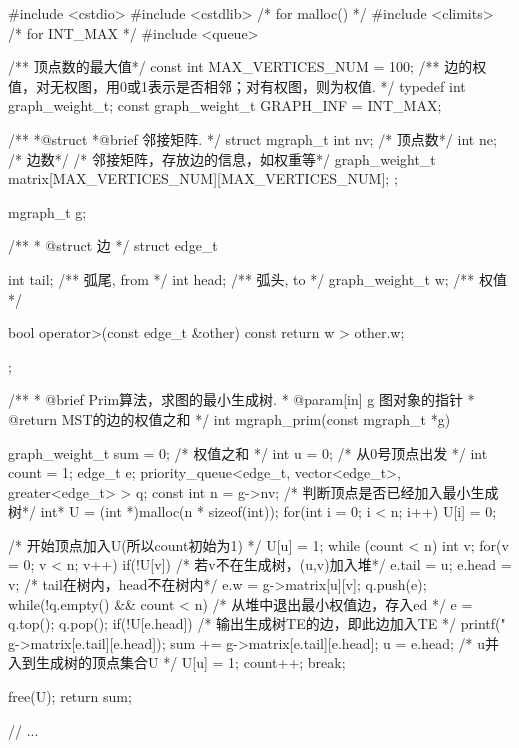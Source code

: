 \begin{Codex}[label=mgraph_prim2.cpp]
#include <cstdio>
#include <cstdlib>  /* for malloc() */
#include <climits>  /* for INT_MAX */
#include <queue>

/** 顶点数的最大值*/
const int MAX_VERTICES_NUM = 100;
/** 边的权值，对无权图，用0或1表示是否相邻；对有权图，则为权值. */
typedef int graph_weight_t;
const graph_weight_t GRAPH_INF = INT_MAX;

/**
 *@struct
 *@brief 邻接矩阵.
 */
struct mgraph_t {
    int nv; /* 顶点数*/
    int ne; /* 边数*/
    /* 邻接矩阵，存放边的信息，如权重等*/
    graph_weight_t matrix[MAX_VERTICES_NUM][MAX_VERTICES_NUM];
};

mgraph_t g;


/**
 * @struct 边
 */
struct edge_t{
    int tail;  /** 弧尾, from */
    int head;  /** 弧头, to */
    graph_weight_t w;  /** 权值 */

    bool operator>(const edge_t &other) const {
        return w > other.w;
    }
};

/**
  * @brief Prim算法，求图的最小生成树.
  * @param[in] g 图对象的指针
  * @return MST的边的权值之和
  */
int mgraph_prim(const mgraph_t *g){
    graph_weight_t sum = 0; /* 权值之和 */
    int u = 0; /* 从0号顶点出发 */
    int count = 1;
    edge_t e;
    priority_queue<edge_t, vector<edge_t>, greater<edge_t> > q;
    const int n = g->nv;
    /* 判断顶点是否已经加入最小生成树*/
    int* U = (int *)malloc(n * sizeof(int));
    for(int i = 0; i < n; i++) U[i] = 0;

    /* 开始顶点加入U(所以count初始为1) */
    U[u] = 1;
    while (count < n) {
        int v;
        for(v = 0; v < n; v++) if(!U[v]) { /* 若v不在生成树，(u,v)加入堆*/
            e.tail = u;
            e.head = v;
            /* tail在树内，head不在树内*/
            e.w = g->matrix[u][v];
            q.push(e);
        }
        while(!q.empty() && count < n) {
            /* 从堆中退出最小权值边，存入ed */
            e = q.top(); q.pop();
            if(!U[e.head]) {
                /* 输出生成树TE的边，即此边加入TE */
                printf("%
                        g->matrix[e.tail][e.head]);
                sum += g->matrix[e.tail][e.head];
                u = e.head;
                /* u并入到生成树的顶点集合U */
                U[u] = 1;
                count++;
                break;
            }
        }
    }

    free(U);
    return sum;
}

// ...
\end{Codex}

